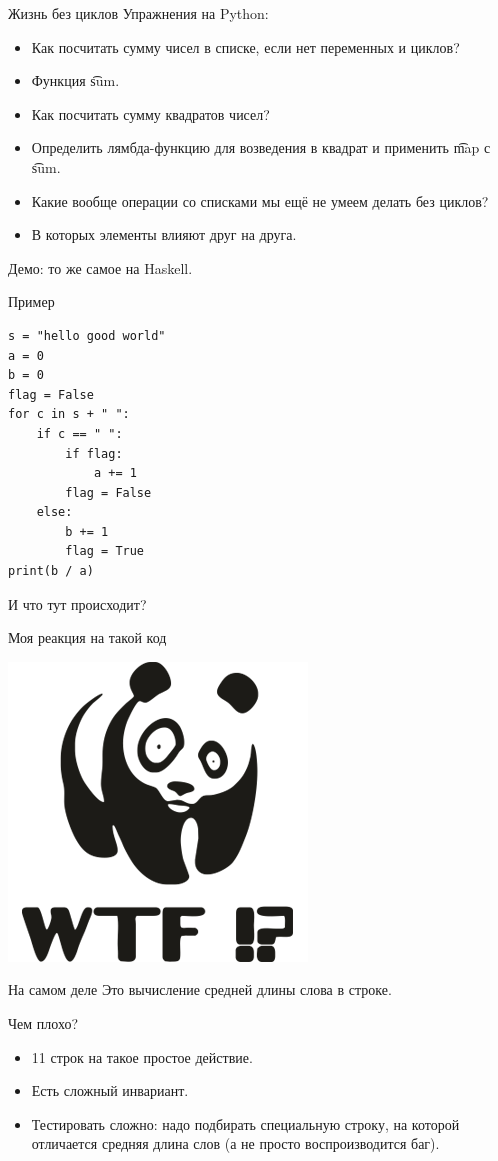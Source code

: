 \begin{frame}{Жизнь без циклов}
	Упражнения на Python:
	\begin{itemize}
		\item Как посчитать сумму чисел в списке, если нет переменных и циклов?\pause
		\item Функция \t{sum}.\pause
		\item Как посчитать сумму квадратов чисел? \pause
		\item Определить лямбда-функцию для возведения в квадрат и применить \t{map} с \t{sum}.\pause
		\item Какие вообще операции со списками мы ещё не умеем делать без циклов? \pause
		\item В которых элементы влияют друг на друга.
	\end{itemize}
	Демо: то же самое на Haskell.
\end{frame}

\begin{frame}[fragile]{Пример}
\begin{verbatim}
s = "hello good world"
a = 0
b = 0
flag = False
for c in s + " ":
    if c == " ":
        if flag:
            a += 1
        flag = False
    else:
        b += 1
        flag = True
print(b / a)
\end{verbatim}
	И что тут происходит?
\end{frame}

\begin{frame}{Моя реакция на такой код}
	\begin{center}
		\includegraphics{wtf-panda.png}
	\end{center}
\end{frame}

\begin{frame}[fragile]{На самом деле}
	Это вычисление средней длины слова в строке.

	Чем плохо?
	\begin{itemize}
		\item 11 строк на такое простое действие.
		\item Есть сложный инвариант.
		\item Тестировать сложно: надо подбирать специальную строку, на которой отличается средняя длина слов (а не просто воспроизводится баг).
	\end{itemize}
\end{frame}

